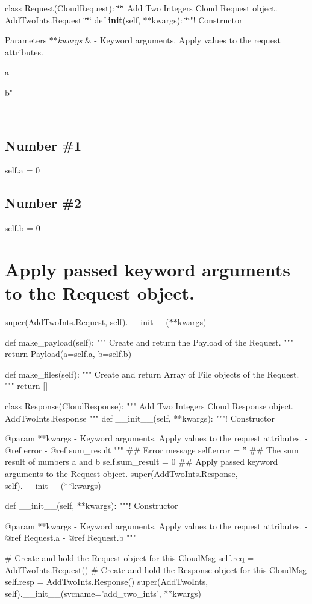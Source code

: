 class Request(\-Cloud\-Request)\-: \char`\"{}\char`\"{}\char`\"{} Add Two Integers Cloud Request object. Add\-Two\-Ints.\-Request \char`\"{}\char`\"{}\char`\"{} def {\bfseries init}(self, $\ast$$\ast$kwargs)\-: \char`\"{}\char`\"{}"! Constructor 
\begin{DoxyParams}{Parameters}
{\em $\ast$$\ast$kwargs} & -\/ Keyword arguments. Apply values to the request attributes.
\begin{DoxyItemize}
\item a
\item b"
\end{DoxyItemize}\\
\hline
\end{DoxyParams}
\subsection*{Number \#1}

self.\-a = 0 \subsection*{Number \#2}

self.\-b = 0 \section*{Apply passed keyword arguments to the Request object.}

super(Add\-Two\-Ints.\-Request, self).\-\_\-\-\_\-init\-\_\-\-\_\-($\ast$$\ast$kwargs)

\begin{DoxyVerb}    def make_payload(self):
        """ Create and return the Payload of the Request. """
        return Payload(a=self.a, b=self.b)

    def make_files(self):
        """ Create and return Array of File objects of the Request. """
        return []

    class Response(CloudResponse):
        """ Add Two Integers Cloud Response object. AddTwoInts.Response """
        def __init__(self, **kwargs):
            """!
            Constructor

            @param **kwargs - Keyword arguments. Apply values to the request attributes.
            - @ref error
            - @ref sum_result
            """
            ## Error message
            self.error = ''
            ## The sum result of numbers a and b
            self.sum_result = 0
            ## Apply passed keyword arguments to the Request object.
            super(AddTwoInts.Response, self).__init__(**kwargs)


    def __init__(self, **kwargs):
        """!
        Constructor

        @param **kwargs - Keyword arguments. Apply values to the request attributes.
            - @ref Request.a
            - @ref Request.b
        """

        # Create and hold the Request object for this CloudMsg
        self.req = AddTwoInts.Request()
        # Create and hold the Response object for this CloudMsg
        self.resp = AddTwoInts.Response()
        super(AddTwoInts, self).__init__(svcname='add_two_ints', **kwargs)
\end{DoxyVerb}


